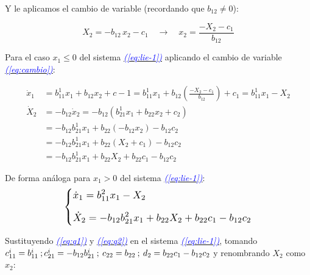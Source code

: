 \documentclass[12pt,a4paper]{report} %
\newcommand{\eref}[1]{\hyperref[#1]{\textcolor{blue}{\textit{(\ref*{#1})}}}}
\begin{document}
	Y le aplicamos el cambio de variable (recordando que $b_{12}\neq0$): 
	
	\begin{equation}
		\label{eq:cambio}
		X_2=-b_{12}\,x_2-c_1\quad \rightarrow \quad x_2=\frac{-X_2-c_1}{b_{12}}
	\end{equation}\smallskip

	Para el caso $x_1\leq 0$ del sistema \eref{eq:lie-1} aplicando el cambio de variable \eref{eq:cambio}:
	
	\begin{equation}
		\label{eq:q1}
	\begin{aligned}
		\dot{x}_1&=b_{11}^1x_1+b_{12}x_2+c-1=b_{11}^1x_1+b_{12}\left(\frac{-X_2-c_1}{b_{12}}\right)+c_1=b_{11}^1x_1-X_2 \\[2mm]
		\dot{X}_2&=-b_{12}\dot{x}_2=-b_{12}\left(b_{21}^1x_1+b_{22}x_2+c_2\right) \\[2mm]
		&=-b_{12}b_{21}^1x_1+b_{22}\left(-b_{12}x_2\right)-b_{12}c_2  \\[2mm]
		&=-b_{12}b_{21}^1x_1+b_{22}\left(X_2+c_1\right)-b_{12}c_2 \\[2mm]
		&=-b_{12}b_{21}^1x_1+b_{22}X_2+b_{22}c_1-b_{12}c_2
	\end{aligned}
	\end{equation}\smallskip
	
	
	De forma análoga para $x_1>0$ del sistema \eref{eq:lie-1}:
	\begin{equation}
		\label{eq:q2}
		\scalebox{1.2}{$\displaystyle
			\left\{
			\begin{aligned}
			&\dot{x}_1=b_{11}^2x_1-X_2 \\[2mm]
			&\dot{X}_2=-b_{12}b_{21}^2x_1+b_{22}X_2+b_{22}c_1-b_{12}c_2
		\end{aligned}
		\right.
		$}
	\end{equation}\smallskip
	
	Sustituyendo \eref{eq:q1} y \eref{eq:q2} en el sistema \eref{eq:lie-1}, tomando $c_{11}^i=b_{11}^i \: ; \: \\c_{21}^i=-b_{12}b_{21}^i \: ; \: c_{22}=b_{22} \: ; \: d_2=b_{22}c_1-b_{12}c_2$ y renombrando $X_2$ como $x_2$:
	
\end{document}
